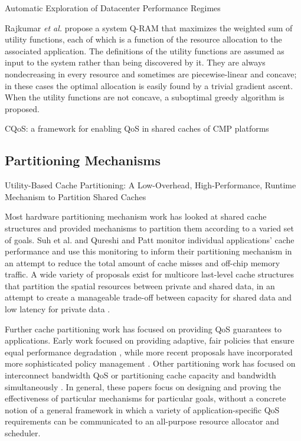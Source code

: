 Automatic Exploration of Datacenter Performance Regimes
\cite{bodik-acdc09}

%
Rajkumar \emph{et al.}\cite{828990} propose a system Q-RAM that maximizes the weighted sum of utility functions,
each of which is a function of the resource allocation to the associated application.
The definitions of the utility functions are assumed as input to the system rather than being discovered by it.
They are always nondecreasing in every resource and sometimes are piecewise-linear and concave;
in these cases the optimal allocation is easily found by a trivial gradient ascent.
When the utility functions are not concave, a suboptimal greedy algorithm is proposed.

CQoS: a framework for enabling QoS in shared caches of CMP platforms
\cite{1006246}

\subsection{Partitioning Mechanisms}
\label{sec:rel:pm}

Utility-Based Cache Partitioning: A Low-Overhead, High-Performance, Runtime Mechanism to Partition Shared Caches
\cite{1194855}

Most hardware partitioning mechanism work has looked at shared cache structures and provided mechanisms to partition them according to a varied set of goals.  Suh et al. \cite{876484, 967444} and Qureshi and Patt \cite{1194855} monitor individual applications' cache performance and use this monitoring to inform their partitioning mechanism in an attempt to reduce the total amount of cache misses and off-chip memory traffic. A wide variety of proposals exist for multicore last-level cache structures that partition the spatial resources between private and shared data, in an attempt to create a manageable trade-off between capacity for shared data and low latency for private data \cite{1275005,1194858,1318096,1088154,1399973,1069998,1399982}.

Further cache partitioning work has focused on providing QoS guarantees to applications. Early work focused on providing adaptive, fair policies that ensure equal performance degradation \cite{605420,1086328}, while more recent proposals have incorporated more sophisticated policy management \cite{1241608,1331730,1152161,1254886}. Other partitioning work has focused on interconnect bandwidth QoS \cite{1382130} or partitioning cache capacity and bandwidth simultaneously \cite{1250671}. In general, these papers focus on designing and proving the effectiveness of particular mechanisms for particular goals, without a concrete notion of a general framework in which a variety of application-specific QoS requirements can be communicated to an all-purpose resource allocator and scheduler.

